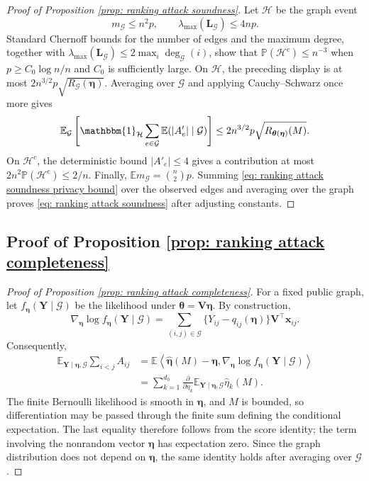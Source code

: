 \documentclass[letterpaper,12pt]{article}
\numberwithin{equation}{section}
\theoremstyle{plain}
\numberwithin{Theorem}{section}
\numberwithin{proposition}{section}
\numberwithin{Lemma}{section}
{
	\theoremstyle{definition}
	\newtheorem{Definition}{Definition}
	\newtheorem{example}{Example}
	\numberwithin{example}{section}
	\newtheorem{fact}{Fact}
	\numberwithin{fact}{section}
	\newtheorem{remark}{Remark}
}
\newcommand{\Pro}{\mathbb{P}}
\newcommand{\1}{\mathbbm{1}}
\def\bth{{\boldsymbol{\theta}}}
\def\E{\mathbb{E}}
\begin{document}
{\begin{proof}[Proof of Proposition \ref{prop: ranking attack soundness}]
Let $\mathcal H$ be the graph event
\[
m_{\mathcal G}\leq n^2p,\qquad \lambda_{\max}(\bm L_{\mathcal G})\leq4np.
\]
Standard Chernoff bounds for the number of edges and the maximum degree, together with
$\lambda_{\max}(\bm L_{\mathcal G})\leq2\max_i\deg_{\mathcal G}(i)$, show that
$\Pro(\mathcal H^c)\leq n^{-3}$ when $p\geq C_0\log n/n$ and $C_0$ is sufficiently large. On $\mathcal H$, the preceding display is at most
$2n^{3/2}p\sqrt{R_{\mathcal G}(\bm\eta)}$. Averaging over $\mathcal G$ and applying Cauchy--Schwarz once more gives
\[
\E_{\mathcal G}\left[\1_{\mathcal H}\sum_{e\in\mathcal G}\E(|A'_e|\mid\mathcal G)\right]
\leq2n^{3/2}p\sqrt{R_{\bth(\bm\eta)}(M)}.
\]
On $\mathcal H^c$, the deterministic bound $|A'_e|\leq4$ gives a contribution at most $2n^2\Pro(\mathcal H^c)\leq2/n$. Finally,
$\E m_{\mathcal G}=\binom n2p$. Summing \eqref{eq: ranking attack soundness privacy bound} over the observed edges and averaging over the graph proves \eqref{eq: ranking attack soundness} after adjusting constants.
\end{proof}

\subsection{Proof of Proposition \ref{prop: ranking attack completeness}}\label{sec: proof of prop: ranking attack completeness}
\begin{proof}[Proof of Proposition \ref{prop: ranking attack completeness}]
For a fixed public graph, let $f_{\bm\eta}(\bm Y\mid\mathcal G)$ be the likelihood under $\bth=\bm V\bm\eta$. By construction,
\[
\nabla_{\bm\eta}\log f_{\bm\eta}(\bm Y\mid\mathcal G)
=\sum_{(i,j)\in\mathcal G}\{Y_{ij}-q_{ij}(\bm\eta)\}\bm V^\top\bm x_{ij}.
\]
Consequently,
\begin{align*}
\E_{\bm Y\mid\bm\eta,\mathcal G}\sum_{i<j}A_{ij}
&=\E\left\langle\widehat{\bm\eta}(M)-\bm\eta,
\nabla_{\bm\eta}\log f_{\bm\eta}(\bm Y\mid\mathcal G)\right\rangle\\
&=\sum_{k=1}^{d_0}\frac{\partial}{\partial\eta_k}
\E_{\bm Y\mid\bm\eta,\mathcal G}\widehat\eta_k(M).
\end{align*}
The finite Bernoulli likelihood is smooth in $\bm\eta$, and $M$ is bounded, so differentiation may be passed through the finite sum defining the conditional expectation. The last equality therefore follows from the score identity; the term involving the nonrandom vector $\bm\eta$ has expectation zero. Since the graph distribution does not depend on $\bm\eta$, the same identity holds after averaging over $\mathcal G$.


\end{proof}}
\end{document}
